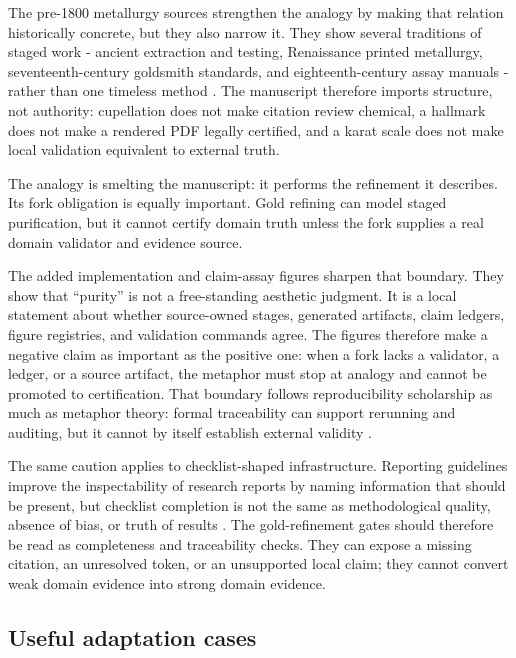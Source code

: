 \documentclass[
]{article}
\begin{document}
The pre-1800 metallurgy sources strengthen the analogy by making that
relation historically concrete, but they also narrow it. They show
several traditions of staged work - ancient extraction and testing,
Renaissance printed metallurgy, seventeenth-century goldsmith standards,
and eighteenth-century assay manuals - rather than one timeless method
\citep{pliny_natural_history_33, biringuccio_pirotechnia_1540, agricola_de_re_metallica_1556, badcock_touchstone_1678, cramer_assaying_metals_1741}.
The manuscript therefore imports structure, not authority: cupellation
does not make citation review chemical, a hallmark does not make a
rendered PDF legally certified, and a karat scale does not make local
validation equivalent to external truth.

The analogy is smelting the manuscript: it performs the refinement it
describes. Its fork obligation is equally important. Gold refining can
model staged purification, but it cannot certify domain truth unless the
fork supplies a real domain validator and evidence source.

The added implementation and claim-assay figures sharpen that boundary.
They show that ``purity'' is not a free-standing aesthetic judgment. It
is a local statement about whether source-owned stages, generated
artifacts, claim ledgers, figure registries, and validation commands
agree. The figures therefore make a negative claim as important as the
positive one: when a fork lacks a validator, a ledger, or a source
artifact, the metaphor must stop at analogy and cannot be promoted to
certification. That boundary follows reproducibility scholarship as much
as metaphor theory: formal traceability can support rerunning and
auditing, but it cannot by itself establish external validity
\citep{peng2011reproducible, wilkinson2016fair, ioannidis2005false}.

The same caution applies to checklist-shaped infrastructure. Reporting
guidelines improve the inspectability of research reports by naming
information that should be present, but checklist completion is not the
same as methodological quality, absence of bias, or truth of results
\citep{equator_network_reporting_guidelines, schulz2010consort, page2021prisma}.
The gold-refinement gates should therefore be read as completeness and
traceability checks. They can expose a missing citation, an unresolved
token, or an unsupported local claim; they cannot convert weak domain
evidence into strong domain evidence.

\subsection{Useful adaptation cases}\label{useful-adaptation-cases}
\end{document}
